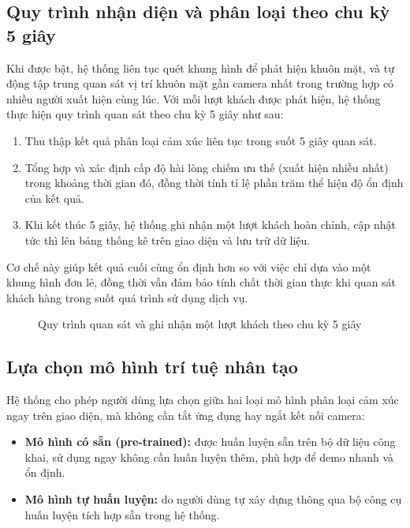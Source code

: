 \documentclass{iaesarticle}
\begin{document}
\subsection{Quy trình nhận diện và phân loại theo chu kỳ 5 giây}
Khi được bật, hệ thống liên tục quét khung hình để phát hiện khuôn mặt, và tự động tập trung quan sát vị trí khuôn mặt gần camera nhất trong trường hợp có nhiều người xuất hiện cùng lúc. Với mỗi lượt khách được phát hiện, hệ thống thực hiện quy trình quan sát theo chu kỳ 5 giây như sau:
\begin{enumerate}[topsep=0.3ex, itemsep=0.3ex, parsep=0.2ex]
	\item Thu thập kết quả phân loại cảm xúc liên tục trong suốt 5 giây quan sát.
	\item Tổng hợp và xác định cấp độ hài lòng chiếm ưu thế (xuất hiện nhiều nhất) trong khoảng thời gian đó, đồng thời tính tỉ lệ phần trăm thể hiện độ ổn định của kết quả.
	\item Khi kết thúc 5 giây, hệ thống ghi nhận một lượt khách hoàn chỉnh, cập nhật tức thì lên bảng thống kê trên giao diện và lưu trữ dữ liệu.
\end{enumerate}
Cơ chế này giúp kết quả cuối cùng ổn định hơn so với việc chỉ dựa vào một khung hình đơn lẻ, đồng thời vẫn đảm bảo tính chất thời gian thực khi quan sát khách hàng trong suốt quá trình sử dụng dịch vụ.

\begin{figure}[H]
\centering
{}
\vspace{.7em}
\caption{Quy trình quan sát và ghi nhận một lượt khách theo chu kỳ 5 giây}
\end{figure}

\subsection{Lựa chọn mô hình trí tuệ nhân tạo}
Hệ thống cho phép người dùng lựa chọn giữa hai loại mô hình phân loại cảm xúc ngay trên giao diện, mà không cần tắt ứng dụng hay ngắt kết nối camera:
\begin{itemize}[topsep=0.3ex, itemsep=0.3ex, parsep=0.2ex]
	\item[-] \textbf{Mô hình có sẵn (pre-trained):} được huấn luyện sẵn trên bộ dữ liệu công khai, sử dụng ngay không cần huấn luyện thêm, phù hợp để demo nhanh và ổn định.
	\item[-] \textbf{Mô hình tự huấn luyện:} do người dùng tự xây dựng thông qua bộ công cụ huấn luyện tích hợp sẵn trong hệ thống.
\end{itemize}
\end{document}

